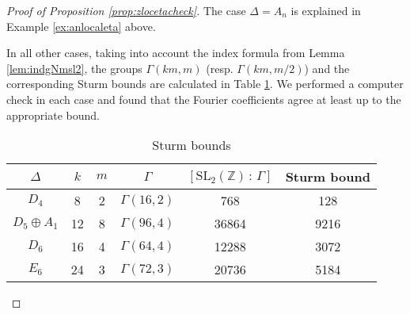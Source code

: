 \documentclass[11pt,a4paper]{amsart}
\theoremstyle{definition}
\newcommand{\SZ}{\mathbb{Z}}                    %
\begin{document}
\begin{proof}[{Proof of Proposition \ref{prop:zlocetacheck}}]
The case $\Delta=A_n$ is explained in Example \ref{ex:anlocaleta} above. 



In all other cases, taking into account the index formula from Lemma \ref{lem:indgNmsl2}, the groups $\Gamma(km,m)$ (resp. $\Gamma(km,m/2)$) and the corresponding Sturm bounds are calculated in Table \ref{table:sturm}. We performed a computer check in each case and found that the Fourier coefficients agree at least up to the appropriate bound.

\begin{table}
	\begin{tabular}{ |c|c|c|c|c|c| }
		\hline
		$\Delta$ & $k$ & $m$ & $\Gamma$ & $[\mathrm{SL}_2(\SZ) \, : \, \Gamma]$ & Sturm bound \\
		\hline
		$D_4$ & 8 & 2 & $\Gamma(16,2)$ & 768 & 128 \\
		$D_5\oplus A_1$ & 12 & 8 & $\Gamma(96,4)$ & 36864 & 9216 \\
		$D_6$ & 16 & 4 & $\Gamma(64,4)$ & 12288 & 3072 \\
		$E_6$ & 24 & 3 & $\Gamma(72,3)$ & 20736 & 5184 \\
		\hline
	\end{tabular}
	\vspace{0.2in}
	\caption{Sturm bounds}
	\label{table:sturm}
\end{table}


\end{proof}
\end{document}
